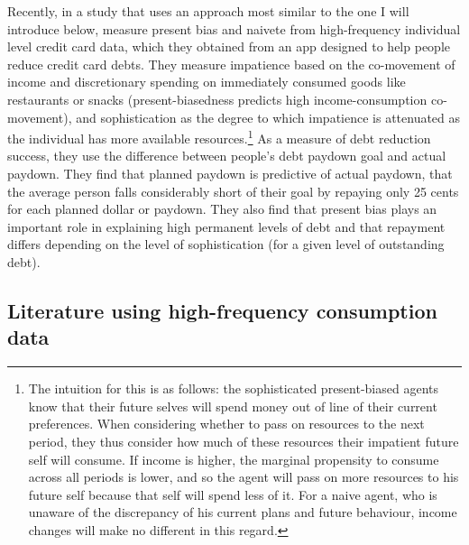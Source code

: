 \documentclass[a4paper, 11pt]{report}
\begin{document}
Recently, in a study that uses an approach most similar to the one I will introduce below, \citet{kuchler2020sticking} measure present bias and naivete from high-frequency individual level credit card data, which they obtained from an app designed to help people reduce credit card debts. They measure impatience based on the co-movement of income and discretionary spending on immediately consumed goods like restaurants or snacks (present-biasedness predicts high income-consumption co-movement), and sophistication as the degree to which impatience is attenuated as the individual has more available resources.\footnote{The intuition for this is as follows: the sophisticated present-biased agents know that their future selves will spend money out of line of their current preferences. When considering whether to pass on resources to the next period, they thus consider how much of these resources their impatient future self will consume. If income is higher, the marginal propensity to consume across all periods is lower, and so the agent will pass on more resources to his future self because that self will spend less of it. For a naive agent, who is unaware of the discrepancy of his current plans and future behaviour, income changes will make no different in this regard.} As a measure of debt reduction success, they use the difference between people's debt paydown goal and actual paydown. They find that planned paydown is predictive of actual paydown, that the average person falls considerably short of their goal by repaying only 25 cents for each planned dollar or paydown. They also find that present bias plays an important role in explaining high permanent levels of debt and that repayment differs depending on the level of sophistication (for a given level of outstanding debt).


\subsection{Literature using high-frequency consumption data}
\end{document}
